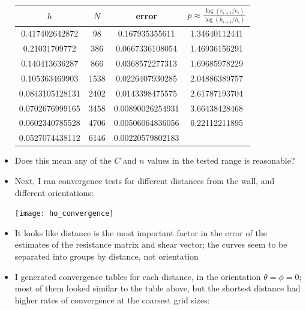 \documentclass{article}
\begin{document}
\begin{itemize}
  \begin{center}
    \begin{tabular}{cccc}\toprule
      $h$ & $N$ & error & $p \approx \frac{\log(e_{i+1} /
                          e_i)}{\log(h_{i+1} / h_i)}$ \\ \midrule
      0.417402642872 & 98 & 0.167935355611 & 1.34640112441 \\
      0.21031709772 & 386 & 0.0667336108054 & 1.46936156291 \\
      0.140413636287 & 866 & 0.0368572277313 & 1.69685978229 \\
      0.105363469903 & 1538 & 0.0226407930285 & 2.04886389757 \\
      0.0843105128131 & 2402 & 0.0143398475575 & 2.61787193704 \\
      0.0702676999165 & 3458 & 0.00890026254931 & 3.66438428468 \\
      0.0602340785528 & 4706 & 0.00506064836056 & 6.22112211895 \\
      0.0527074438112 & 6146 & 0.00220579802183 &  \\ \bottomrule
    \end{tabular}    
  \end{center}

\item Does this mean any of the $C$ and $n$ values in the tested range
  is reasonable?
\item Next, I ran convergence tests for different distances from the
  wall, and different orientations:

  \begin{center}
    \texttt{[image: ho\_convergence]}
  \end{center}
\item It looks like distance is the most important factor in the error of the
  estimates of the resistance matrix and shear vector; the curves seem
  to be separated into groups by distance, not orientation
\item I generated convergence tables for each distance, in the
  orientation $\theta = \phi = 0$; most of them looked similar to the
  table above, but the shortest distance had higher rates of
  convergence at the coarsest grid sizes:


\end{itemize}
\end{document}
